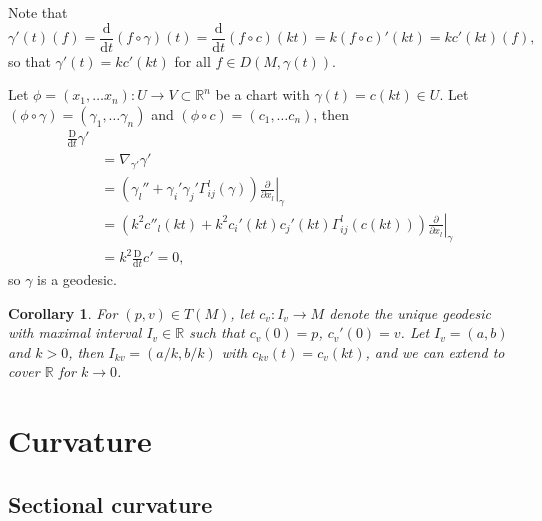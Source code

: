 \documentclass[letter-paper]{tufte-book}
\newtheorem{corollary}[theorem]{\color{pastel-blue}Corollary}
\newenvironment{proof}[1][Proof]{\begin{trivlist}
\item[\hskip \labelsep {\bfseries #1}]}{\end{trivlist}}
\begin{document}
\begin{proof}
  Note that
  \begin{equation*}
    \gamma'(t)(f) = \frac{\mathrm{d}}{\mathrm{d}t} (f\circ \gamma)(t) = \frac{\mathrm{d}}{\mathrm{d}t} (f\circ c)(kt) = k(f\circ c)'(kt) = kc'(kt)(f),
  \end{equation*}
  so that $\gamma'(t) = kc'(kt)$ for all $f \in D(M, \gamma(t))$.
  
  Let $\phi = (x_1, \ldots x_n): U\to V\subset\mathbb{R}^n$ be a chart with $\gamma(t) = c(kt) \in U$. Let $(\phi\circ \gamma) = (\gamma_1, \ldots \gamma_n)$ and $(\phi\circ c) = (c_1, \ldots c_n)$, then
  \begin{align*}
    \frac{\mathrm{D}}{\mathrm{d}t} \gamma'\\
      &= \nabla_{\gamma'}\gamma' \\
      &= \left(\gamma_l'' + \gamma_i'\gamma_j' \Gamma_{ij}^l(\gamma)\right) \left.\frac{\partial}{\partial x_l}\right|_{\gamma}\\
      &=\left( k^2 c''_l(kt) + k^2 c_i'(kt)c_j'(kt) \Gamma_{ij}^l(c(kt)) \right) \left.\frac{\partial}{\partial x_l}\right|_{\gamma}\\
      &= k^2 \frac{\mathrm{D}}{\mathrm{d}t} c' = 0,
  \end{align*}
  so $\gamma$ is a geodesic.
\end{proof}

\begin{corollary}
  For $(p,v) \in T(M)$, let $c_v : I_v \to M$ denote the unique geodesic with maximal interval $I_v \in \mathbb{R}$ such that $c_v(0) = p$, $c_v'(0) = v$. Let $I_v = (a,b)$ and $k>0$, then $I_{kv} = (a/k, b/k)$ with $c_{kv}(t) = c_v(kt)$, and we can extend to cover $\mathbb{R}$ for $k\to 0$.
\end{corollary}


\chapter{Curvature}


\section{Sectional curvature}

\end{document}

